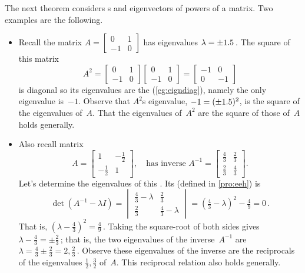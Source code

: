 \begin{example} \label{eg:2x2powmat}
The next theorem considers s and eigenvectors of powers of a matrix.  
Two examples are the following.
\begin{itemize}
\item Recall the matrix \(A=\begin{bmatrix} 0&1\\-1&0 \end{bmatrix}\) has eigenvalues \(\lambda=\pm 1.5\)\,.  The square of this matrix
\begin{equation*}
A^2=\begin{bmatrix} 0&1\\-1&0 \end{bmatrix}\begin{bmatrix} 0&1\\-1&0 \end{bmatrix}
=\begin{bmatrix} -1&0\\0&-1 \end{bmatrix}
\end{equation*}
is diagonal so its eigenvalues are the  (\autoref{eg:eigndiag}), namely the only eigenvalue is~\(-1\).
Observe that \(A^2\)s eigenvalue, \(-1=(\pm 1.5)^2\), is the square of the eigenvalues of~\(A\).
That the eigenvalues of~\(A^2\) are the square of those of~\(A\) holds generally.

\item Also recall matrix 
\begin{equation*}
A=\begin{bmatrix} 1&-\frac12\\-\frac12&1 \end{bmatrix},
\quad\text{has inverse }A^{-1}=\begin{bmatrix} \frac43&\frac23\\\frac23&\frac43 \end{bmatrix}.
\end{equation*}
Let's determine the eigenvalues of this .
Its  (defined in \autoref{pro:eeh}) is
\begin{equation*}
\det(A^{-1}-\lambda I)
=\begin{vmatrix} \frac43-\lambda&\frac23\\\frac23&\frac43-\lambda \end{vmatrix}
=(\tfrac43-\lambda)^2-\tfrac49=0\,.
\end{equation*}
That is, \((\lambda-\tfrac43)^2=\tfrac49\)\,.
Taking the square-root of both sides gives \(\lambda-\tfrac43=\pm\tfrac23\)\,; that is, the two eigenvalues of the inverse~\(A^{-1}\) are \(\lambda=\tfrac43\pm\tfrac23=2,\tfrac23\)\,.
Observe these eigenvalues of the inverse are the reciprocals of the eigenvalues \(\frac12,\frac32\) of~\(A\).
This reciprocal relation also holds generally.


\end{itemize}
\end{example}
